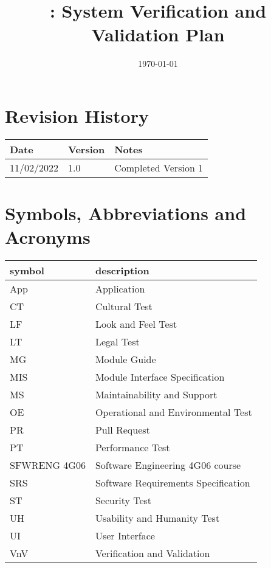 \documentclass[12pt, titlepage]{article}
\begin{document}
	
	\title{\progname{}: System Verification and Validation Plan} 
	\author{\authname}
	\date{\today}
	
	\maketitle
	
	
	\section{Revision History}
	
	\begin{tabularx}{\textwidth}{p{3cm}p{2cm}X}
		\toprule {\bf Date} & {\bf Version} & {\bf Notes}\\
		\midrule
		11/02/2022 & 1.0 & Completed Version 1\\
		\bottomrule
	\end{tabularx}
	
	\newpage
	
	\tableofcontents
	
	\listoftables
	
	\newpage
	
	\section{Symbols, Abbreviations and Acronyms}
	
	\renewcommand{\arraystretch}{1.2}
	\begin{tabular}{l l} 
		\toprule		
		\textbf{symbol} & \textbf{description}\\
		\midrule 
		App & Application\\
		CT & Cultural Test\\
		LF & Look and Feel Test\\
		LT & Legal Test\\
		MG & Module Guide\\
		MIS & Module Interface Specification\\
		MS & Maintainability and Support\\
		OE & Operational and Environmental Test\\
		PR& Pull Request\\
		PT& Performance Test\\
		SFWRENG 4G06& Software Engineering 4G06 course\\
		SRS & Software Requirements Specification\\
		ST & Security Test\\
		UH & Usability and Humanity Test\\
		UI & User Interface\\
		VnV & Verification and Validation\\
		\bottomrule
	\end{tabular}\\
	
\end{document}
